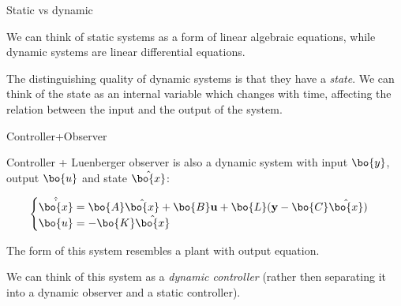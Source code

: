 \documentclass{beamer}
\begin{document}
\begin{frame}{Static vs dynamic}
	\begin{flushleft}
		
		We can think of static systems as a form of linear algebraic equations, while dynamic systems are linear differential equations.
		
		\bigskip
		
		The distinguishing quality of dynamic systems is that they have a \emph{state}. We can think of the state as an internal variable which changes with time, affecting the relation between the input and the output of the system.
		
	\end{flushleft}
\end{frame}



\begin{frame}{Controller+Observer}
	\begin{flushleft}
		
		Controller + Luenberger observer is also a dynamic system with input $\bo{y}$, output $\bo{u}$ and state $\hat{\bo{x}}$:
		
		\begin{equation}
			\begin{cases}
				\hat{\dot {\bo{x}}} = \bo{A} \hat{\bo{x}} + \bo{B} \mathbf u + \bo{L}(\mathbf y - \bo{C} \hat{\bo{x}})
				\\
				\bo{u} = -\bo{K} \hat{\bo{x}}
			\end{cases}
		\end{equation}
		
		The form of this system resembles a plant with output equation.
		
		\bigskip
		
		We can think of this system as a \emph{dynamic controller} (rather then separating it into a dynamic observer and a static controller). 
		
	\end{flushleft}
\end{frame}
\end{document}
